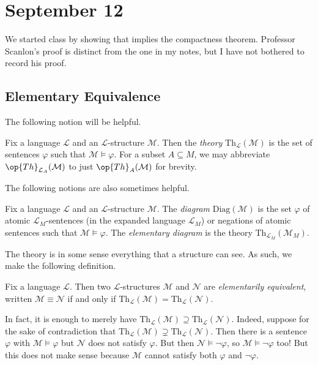 \documentclass[../notes.tex]{subfiles}
\begin{document}
\section{September 12}

We started class by showing that  implies the compactness theorem. Professor Scanlon's proof is distinct from the one in my notes, but I have not bothered to record his proof.

\subsection{Elementary Equivalence}
The following notion will be helpful.
\begin{definition}[theory]
	Fix a language $\mathcal L$ and an $\mathcal L$-structure $\mathcal M$. Then the \textit{theory} $\mathrm{Th}_\mathcal L(\mathcal M)$ is the set of sentences $\varphi$ such that $\mathcal M\models\varphi$. For a subset $A\subseteq M$, we may abbreviate $\op{Th}_{\mathcal L_A}(\mathcal M)$ to just $\op{Th}_A(\mathcal M)$ for brevity.
\end{definition}
The following notions are also sometimes helpful.
\begin{definition}[diagram]
	Fix a language $\mathcal L$ and an $\mathcal L$-structure $\mathcal M$. The \textit{diagram} $\mathrm{Diag}(\mathcal M)$ is the set $\varphi$ of atomic $\mathcal L_M$-sentences (in the expanded language $\mathcal L_M$) or negations of atomic sentences such that $\mathcal M\models\varphi$. The \textit{elementary diagram} is the theory $\mathrm{Th}_{\mathcal L_M}(\mathcal M_M)$.
\end{definition}
The theory is in some sense everything that a structure can see. As such, we make the following definition.
\begin{definition}
	Fix a language $\mathcal L$. Then two $\mathcal L$-structures $\mathcal M$ and $\mathcal N$ are \textit{elementarily equivalent}, written $\mathcal M\equiv\mathcal N$ if and only if $\mathrm{Th}_\mathcal L(\mathcal M)=\mathrm{Th}_\mathcal L(\mathcal N)$.
\end{definition}
\begin{remark} \label{rem:equiv-by-containment}
	In fact, it is enough to merely have $\mathrm{Th}_\mathcal L(\mathcal M)\supseteq\mathrm{Th}_\mathcal L(\mathcal N)$. Indeed, suppose for the sake of contradiction that $\mathrm{Th}_\mathcal L(\mathcal M)\supsetneq\mathrm{Th}_\mathcal L(\mathcal N)$. Then there is a sentence $\varphi$ with $\mathcal M\models\varphi$ but $\mathcal N$ does not satisfy $\varphi$. But then $\mathcal N\models\lnot\varphi$, so $\mathcal M\models\lnot\varphi$ too! But this does not make sense because $\mathcal M$ cannot satisfy both $\varphi$ and $\lnot\varphi$.
\end{remark}
\end{document}
